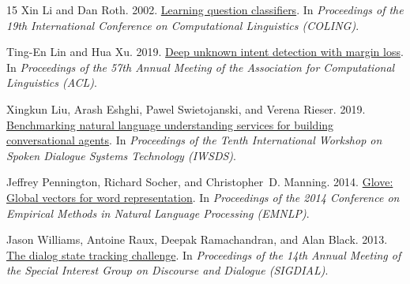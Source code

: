 \documentclass[11pt,a4paper]{article}
\begin{document}
\begin{thebibliography}{15}
Xin Li and Dan Roth. 2002.
\newblock \href {https://doi.org/10.3115/1072228.1072378} {Learning question
  classifiers}.
\newblock In \emph{Proceedings of the 19th International Conference on
  Computational Linguistics (COLING)}.

Ting-En Lin and Hua Xu. 2019.
\newblock \href {https://www.aclweb.org/anthology/P19-1548} {Deep unknown
  intent detection with margin loss}.
\newblock In \emph{Proceedings of the 57th Annual Meeting of the Association
  for Computational Linguistics (ACL)}.

Xingkun Liu, Arash Eshghi, Pawel Swietojanski, and Verena Rieser. 2019.
\newblock \href {https://arxiv.org/pdf/1903.05566.pdf} {Benchmarking natural
  language understanding services for building conversational agents}.
\newblock In \emph{Proceedings of the Tenth International Workshop on Spoken
  Dialogue Systems Technology (IWSDS)}.

Jeffrey Pennington, Richard Socher, and Christopher~D. Manning. 2014.
\newblock \href {https://www.aclweb.org/anthology/D14-1162} {Glove: Global
  vectors for word representation}.
\newblock In \emph{Proceedings of the 2014 Conference on Empirical Methods in
  Natural Language Processing (EMNLP)}.

Jason Williams, Antoine Raux, Deepak Ramachandran, and Alan Black. 2013.
\newblock \href {https://www.aclweb.org/anthology/W13-4065} {The dialog state
  tracking challenge}.
\newblock In \emph{Proceedings of the 14th Annual Meeting of the Special
  Interest Group on Discourse and Dialogue (SIGDIAL)}.

\end{thebibliography}


\end{document}
